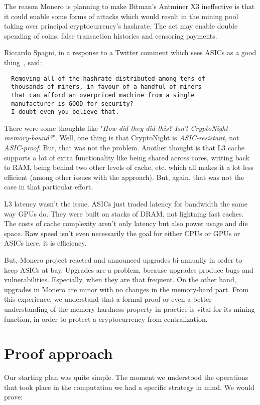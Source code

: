 The reason Monero is planning to make Bitman’s Antminer X3 ineffective is that it could enable some forms of attacks which would result in the mining pool taking over principal cryptocurrency’s hashrate. The act may enable double spending of coins, false transaction histories and censoring payments.

Riccardo Spagni, in a response to a Twitter comment which sees ASICs as a good thing~\cite{fluffypony}, said:
\begin{verbatim}
  Removing all of the hashrate distributed among tens of
  thousands of miners, in favour of a handful of miners
  that can afford an overpriced machine from a single
  manufacturer is GOOD for security?
  I doubt even you believe that.
\end{verbatim}

There were some thoughts like "\emph{How did they did this? Isn't CryptoNight memory-bound?}". Well, one thing is that CryptoNight is \emph{ASIC-resistant}, not \emph{ASIC-proof}. But, that was not the problem. Another thought is that L3 cache supports a lot of extra functionality like being shared across cores, writing back to RAM, being behind two other levels of cache, etc. which all makes it a lot less efficient (among other issues with the approach). But, again, that was not the case in that particular effort.

L3 latency wasn't the issue. ASICs just traded latency for bandwidth the same way GPUs do. They were built on stacks of DRAM, not lightning fast caches. The costs of cache complexity aren't only latency but also power usage and die space. Raw speed isn't even necessarily the goal for either CPUs or GPUs or ASICs here, it is efficiency.

But, Monero project reacted and announced upgrades bi-annually in order to keep ASICs at bay. Upgrades are a problem, because upgrades produce bugs and vulnerabilities. Especially, when they are that frequent. On the other hand, upgrades in Monero are minor with no changes in the memory-hard part. From this experience, we understand that a formal proof or even a better understanding of the memory-hardness property in practice is vital for its mining function, in order to protect a cryptocurrency from centralization.

\section{Proof approach}
%
Our starting plan was quite simple. The moment we understood the operations that took place in the computation we had a specific strategy in mind. We would prove:

